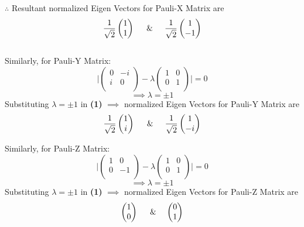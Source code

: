 \documentclass[a4paper, 12pt]{article}
\begin{document}
\begin{flushleft}
\begin{center}
\end{center}
$\therefore$ Resultant normalized Eigen Vectors for Pauli-X Matrix are
\[\frac{1}{\sqrt{2}}\begin{pmatrix}
    1 \\
    1
\end{pmatrix}\hspace{5mm} \& \hspace{5mm}
\frac{1}{\sqrt{2}}\begin{pmatrix}
    1 \\
    -1
\end{pmatrix}\]
\\
Similarly, for Pauli-Y Matrix:
\[\bigg|\begin{pmatrix}
    0 & -i  \\
    i & 0  \\
\end{pmatrix} - \lambda \begin{pmatrix}
    1 & 0 \\
    0 & 1 \\
\end{pmatrix} \bigg| = 0 \]
\[\implies \lambda = \pm 1\]
Substituting $\lambda = \pm 1$ in \textbf{(1)} $\implies$ normalized Eigen Vectors for Pauli-Y Matrix are \[\frac{1}{\sqrt{2}}\begin{pmatrix}
    1 \\
    i \\
\end{pmatrix}\hspace{5mm} \& \hspace{5mm}
\frac{1}{\sqrt{2}}\begin{pmatrix}
    1 \\
    -i \\
\end{pmatrix}\]

Similarly, for Pauli-Z Matrix:
\[\bigg|\begin{pmatrix}
    1 & 0  \\
    0 & -1  \\
\end{pmatrix} - \lambda \begin{pmatrix}
    1 & 0 \\
    0 & 1 \\
\end{pmatrix} \bigg| = 0 \]
\[\implies \lambda = \pm 1\]
Substituting $\lambda = \pm 1$ in \textbf{(1)} $\implies$ normalized Eigen Vectors for Pauli-Z Matrix are \[\begin{pmatrix}
    1 \\
    0 \\
\end{pmatrix}\hspace{5mm} \& \hspace{4mm}
\begin{pmatrix}
    0 \\
    1 \\
\end{pmatrix}\]
\end{flushleft}
\end{document}
